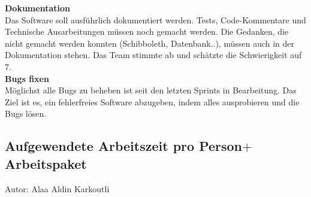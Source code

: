 \textbf{Dokumentation}\\
Das Software soll ausführlich dokumentiert werden. Tests, Code-Kommentare und 
Technische Ausarbeitungen müssen noch gemacht werden. Die Gedanken, die nicht gemacht werden konnten (Schibboleth, Datenbank..), müssen
auch in der Dokumentation stehen. 
Das Team stimmte ab und schätzte die Schwierigkeit auf 7.\\

\textbf{Bugs fixen}\\
Möglichst alle Bugs zu beheben ist seit den letzten Sprints in Bearbeitung. Das Ziel ist es,
ein fehlerfreies Software abzugeben, indem alles ausprobieren und die Bugs lösen.

\subsection{Aufgewendete Arbeitszeit pro Person$+$Arbeitspaket}
{\small Autor: Alaa Aldin Karkoutli}

